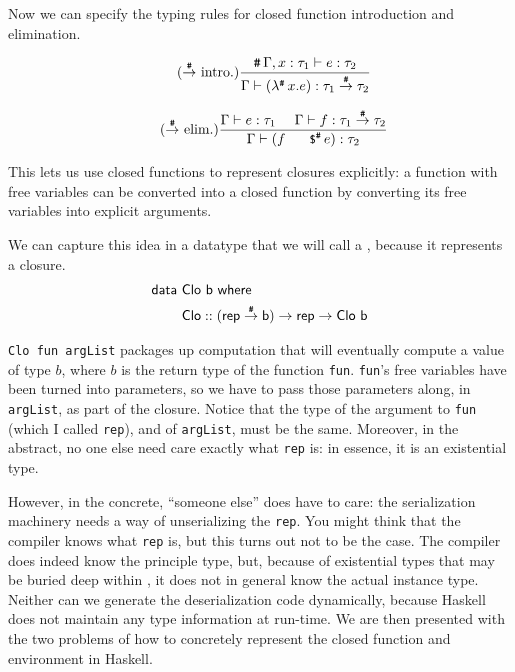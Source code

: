 \documentclass[preprint]{sigplanconf}
\begin{document}
Now we can specify the typing rules for closed function introduction and elimination. 

\begin{equation*}
\tag{\nfn~intro.}
\frac{\closed{\Gamma}, x : \tau_1 \entails e : \tau_2}
		{\Gamma \entails (\nlambda x.e) : \tau_1 \nfn \tau_2}
\end{equation*}


\begin{equation*}
\tag{\nfn~elim.}
\frac{\Gamma \entails e : \tau_1 ~~~~ \Gamma \entails f : \tau_1  \nfn \tau_2}
		{\Gamma \entails (f \napp e) : \tau_2}
\end{equation*}


This lets us use closed functions to represent closures explicitly: a function with free variables can be converted into a closed function by converting its free variables into explicit arguments.

We can capture this idea in a datatype that we will call a , because it represents a closure.
\begin{align*}
\textsf{data}~&\textsf{Clo}~\textsf{b}~\textsf{where}\\
				 	&\sf Clo :: \sf (rep \stackrel{\texttt{\#}}{\rightarrow} b) \rightarrow rep \rightarrow Clo~b
\end{align*}

\texttt{Clo fun argList} packages up computation that will eventually compute a value of type $b$, where $b$ is the return type of the function \texttt{fun}.  
\texttt{fun}'s free variables have been turned into parameters, so we have to pass those parameters along, in \texttt{argList}, as part of the closure.  
Notice that the type of the argument to \texttt{fun} (which I called \texttt{rep}), and of \texttt{argList}, must be the same.
Moreover, in the abstract, no one else need care exactly what \texttt{rep} is: in essence, it is an existential type.

However, in the concrete, ``someone else'' does have to care: the serialization machinery needs a way of unserializing the \texttt{rep}.  
You might think that the compiler knows what \texttt{rep} is, but this turns out not to be the case. 
The compiler does indeed know the principle type, but, because of existential types that may be buried deep within , it does not in general know the 
actual instance type. Neither can we generate the deserialization code dynamically, because Haskell does not maintain any type information at run-time. We are then presented with the two problems of how to concretely represent the closed function and environment in Haskell.
\end{document}
